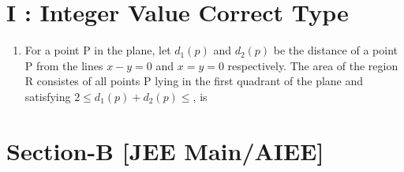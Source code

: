 \documentclass[12pt]{article}
\begin{document}
\section*{I    :     Integer Value Correct Type }
\begin{enumerate}

\item For a point P in the plane, let $d_1(p)$ and $d_2(p)$ be the distance of a point P
from the lines $x-y=0$ and $x=y=0$ respectively. The area of the region R consistes of all points P lying in the first quadrant of the plane and satisfying $2\leq d_1(p)+d_2(p)\leq$, is
\end{enumerate}

\section*{Section-B   [JEE Main/AIEE]}
\end{document}
